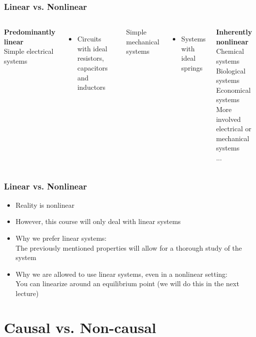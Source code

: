 \documentclass{beamer}
\begin{document}

\begin{frame}
\frametitle{Linear vs. Nonlinear}
\vspace{-8ex}
\begin{columns}
\textbf{\Large{Predominantly linear}}\\
\medskip
Simple electrical systems
\begin{itemize}
\item Circuits with ideal resistors, capacitors and inductors
\end{itemize}
Simple mechanical systems
\begin{itemize}
\item Systems with ideal springs
\end{itemize}
\bigskip

\textbf{\Large{Inherently nonlinear}}\\
\medskip
Chemical systems\\
\smallskip
Biological systems\\
\smallskip
Economical systems\\
\smallskip
More involved electrical or mechanical systems\\
\smallskip
...
\end{columns}
\end{frame}


\begin{frame}
\frametitle{Linear vs. Nonlinear}
\vspace{-11ex}
\begin{itemize}
\item Reality is nonlinear
\item However, this course will only deal with linear systems
\item Why we prefer linear systems: \\
\medskip
The previously mentioned properties will allow for a thorough study of the system
\item Why we are allowed to use linear systems, even in a nonlinear setting:\\
\medskip
You can linearize around an equilibrium point (we will do this in the next lecture)
\end{itemize}
\end{frame}

\section{Causal vs. Non-causal} 
\end{document}
